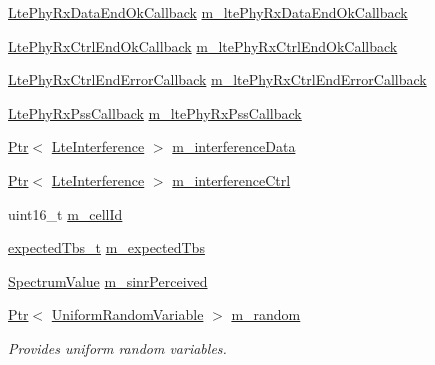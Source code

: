 \begin{DoxyCompactItemize}
\item 
\hyperlink{namespacens3_aeb73b95892e5c82bf5dd9e7f393ebc7a}{Lte\+Phy\+Rx\+Data\+End\+Ok\+Callback} \hyperlink{classns3_1_1LteSpectrumPhy_a973340b85e53a35854a1dd1d437c669c}{m\+\_\+lte\+Phy\+Rx\+Data\+End\+Ok\+Callback}
\item 
\hyperlink{namespacens3_a75b47d60a00f06fe21b43f872bc22bb9}{Lte\+Phy\+Rx\+Ctrl\+End\+Ok\+Callback} \hyperlink{classns3_1_1LteSpectrumPhy_afdc84170299ddcfaa3735907365ecb6d}{m\+\_\+lte\+Phy\+Rx\+Ctrl\+End\+Ok\+Callback}
\item 
\hyperlink{namespacens3_a097aded14de04bf7d1df0316fa68a175}{Lte\+Phy\+Rx\+Ctrl\+End\+Error\+Callback} \hyperlink{classns3_1_1LteSpectrumPhy_aedf905bc6cb012fc963df0a3b6059a53}{m\+\_\+lte\+Phy\+Rx\+Ctrl\+End\+Error\+Callback}
\item 
\hyperlink{namespacens3_a8ac519df0b71201cdd5848027df6d367}{Lte\+Phy\+Rx\+Pss\+Callback} \hyperlink{classns3_1_1LteSpectrumPhy_a2e07c17141a081d14f40ac1f0645482b}{m\+\_\+lte\+Phy\+Rx\+Pss\+Callback}
\item 
\hyperlink{classns3_1_1Ptr}{Ptr}$<$ \hyperlink{classns3_1_1LteInterference}{Lte\+Interference} $>$ \hyperlink{classns3_1_1LteSpectrumPhy_a15a694dda0ac5ef3b0008c3fc2237f35}{m\+\_\+interference\+Data}
\item 
\hyperlink{classns3_1_1Ptr}{Ptr}$<$ \hyperlink{classns3_1_1LteInterference}{Lte\+Interference} $>$ \hyperlink{classns3_1_1LteSpectrumPhy_ad578c25e0d4dd05b888c4dd83ec52e13}{m\+\_\+interference\+Ctrl}
\item 
uint16\+\_\+t \hyperlink{classns3_1_1LteSpectrumPhy_a996732fedbe320aedd9d2def1fc6e3c7}{m\+\_\+cell\+Id}
\item 
\hyperlink{namespacens3_a2657af5d5b5897d8e41530610fee1c0f}{expected\+Tbs\+\_\+t} \hyperlink{classns3_1_1LteSpectrumPhy_a7ac1117604ed722833af5e5538d69251}{m\+\_\+expected\+Tbs}
\item 
\hyperlink{classns3_1_1SpectrumValue}{Spectrum\+Value} \hyperlink{classns3_1_1LteSpectrumPhy_a5b0f6e0a23257ba3d563a39a01413645}{m\+\_\+sinr\+Perceived}
\item 
\hyperlink{classns3_1_1Ptr}{Ptr}$<$ \hyperlink{classns3_1_1UniformRandomVariable}{Uniform\+Random\+Variable} $>$ \hyperlink{classns3_1_1LteSpectrumPhy_affa72b99789e284a3451dbd8efaa7e54}{m\+\_\+random}
\begin{DoxyCompactList}\small\item\em Provides uniform random variables. \end{DoxyCompactList}\item 

\end{DoxyCompactItemize}
